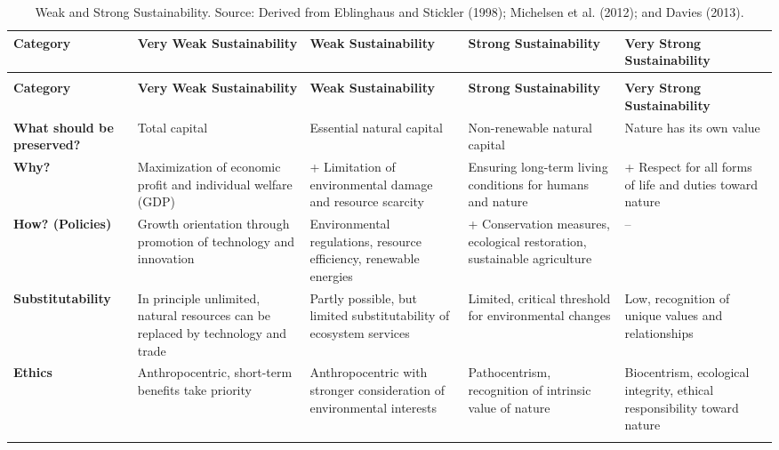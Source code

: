\documentclass[
  a4paper,
  DIV=11,
  numbers=noendperiod,
  oneside,
  openany]{scrreprt}
\begin{document}
\begin{longtable}[t]{>{\raggedright\arraybackslash}p{1.6cm}>{\raggedright\arraybackslash}p{2.3cm}>{\raggedright\arraybackslash}p{2.3cm}>{\raggedright\arraybackslash}p{2.3cm}>{\raggedright\arraybackslash}p{2.3cm}}

\caption{\label{tbl-weak-strong-sustainability}Weak and Strong
Sustainability. Source: Derived from Eblinghaus and Stickler (1998);
{Michelsen et al.} (2012); and Davies (2013).}

\tabularnewline

\toprule
\textbf{Category} & \textbf{Very Weak Sustainability} & \textbf{Weak Sustainability} & \textbf{Strong Sustainability} & \textbf{Very Strong Sustainability}\\
\midrule
\endfirsthead
\multicolumn{5}{@{}l}{\textit{(continued)}}\\
\toprule
\textbf{Category} & \textbf{Very Weak Sustainability} & \textbf{Weak Sustainability} & \textbf{Strong Sustainability} & \textbf{Very Strong Sustainability}\\
\midrule
\endhead

\endfoot
\bottomrule
\endlastfoot
\textbf{What should be preserved?} & Total capital & Essential natural capital & Non-renewable natural capital & Nature has its own value\\
\textbf{Why?} & Maximization of economic profit and individual welfare (GDP) & + Limitation of environmental damage and resource scarcity & Ensuring long-term living conditions for humans and nature & + Respect for all forms of life and duties toward nature\\
\textbf{How? (Policies)} & Growth orientation through promotion of technology and innovation & Environmental regulations, resource efficiency, renewable energies & + Conservation measures, ecological restoration, sustainable agriculture & –\\
\textbf{Substitutability} & In principle unlimited, natural resources can be replaced by technology and trade & Partly possible, but limited substitutability of ecosystem services & Limited, critical threshold for environmental changes & Low, recognition of unique values and relationships\\
\textbf{Ethics} & Anthropocentric, short-term benefits take priority & Anthropocentric with stronger consideration of environmental interests & Pathocentrism, recognition of intrinsic value of nature & Biocentrism, ecological integrity, ethical responsibility toward nature\\*

\end{longtable}
\end{document}
